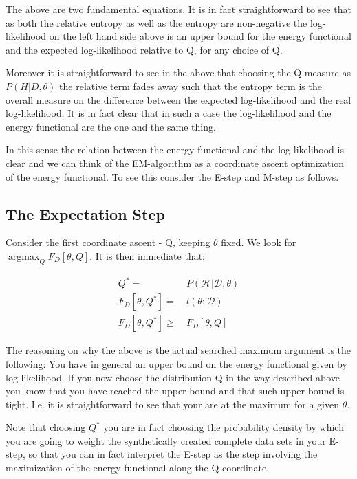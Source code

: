 \documentclass[11pt]{article}
\begin{document}
\begin{article}
The above are two fundamental equations. It is in fact
straightforward to see that as both the relative entropy as well as
the entropy are non-negative the log-likelihood on the left hand
side above is an upper bound for the energy functional and the expected
log-likelihood relative to Q, for any choice of Q.

Moreover it is straightforward to see in the above that choosing the
Q-measure as \(P (H| D, \theta)\) the relative term
fades away such that the entropy term is the overall measure on the
difference between the expected log-likelihood and the real
log-likelihood. It is in fact clear that in such a case the
log-likelihood and the energy functional are the one and the same
thing.

In this sense the relation between the energy functional and the
log-likelihood is clear and we can think of the EM-algorithm as a
coordinate ascent optimization of the energy functional. To see this
consider the E-step and M-step as follows.

\subsection{The Expectation Step}
\label{sec:org7e14f58}

Consider the first coordinate ascent - Q, keeping \(\theta\)
fixed. We look for \(\operatorname*{argmax}_{Q} F_D[\theta, Q]\). It
is then immediate that:

\begin{align} \label{eq:q_optimum}
Q^* =& \ P (\mathscr{H}|\mathscr{D}, \theta) \\
F_D[\theta, Q^*] =& \ l (\theta: \mathscr{D}) \\
F_D[\theta, Q^*] \geq& \ F_D[\theta, Q]
\end{align}

The reasoning on why the above is the actual searched maximum
argument is the following: You have in general an upper bound on the
energy functional given by log-likelihood. If you now choose the
distribution Q in the way described above you know that you have
reached the upper bound and that such upper bound is tight. I.e. it
is straightforward to see that your are at the maximum for a given
\(\theta\).

Note that choosing \(Q^*\) you are in fact choosing the probability
density by which you are going to weight the synthetically created
complete data sets in your E-step, so that you can in fact
interpret the E-step as the step involving the maximization of the
energy functional along the Q coordinate.


\end{article}
\end{document}
